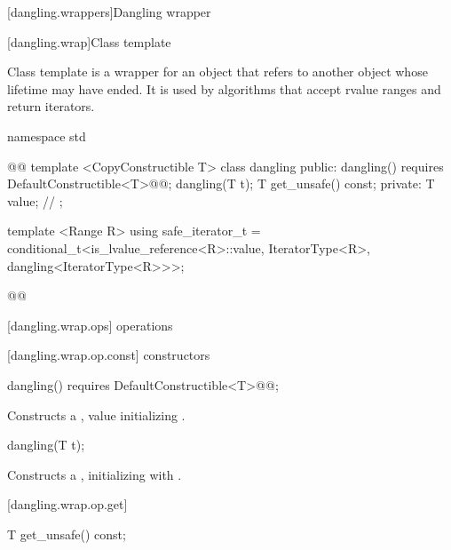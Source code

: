 \begin{addedblock}
{\color{newclr}
[dangling.wrappers]{Dangling wrapper}

[dangling.wrap]{Class template }

\pnum
{}%
Class template  is a wrapper for an object that refers to another object whose
lifetime may have ended. It is used by algorithms that accept rvalue ranges and return iterators.

\begin{codeblock}
namespace std { @@
  template <CopyConstructible T>
  class dangling {
  public:
    dangling() requires DefaultConstructible<T>@\newtxt{()}@;
    dangling(T t);
    T get_unsafe() const;
  private:
    T value; // \expos
  };

  template <Range R>
  using safe_iterator_t =
    conditional_t<is_lvalue_reference<R>::value, IteratorType<R>, dangling<IteratorType<R>>>;
}@\newtxt{\}\}}@
\end{codeblock}

[dangling.wrap.ops]{ operations}

[dangling.wrap.op.const]{ constructors}

%
\begin{itemdecl}
dangling() requires DefaultConstructible<T>@\newtxt{()}@;
\end{itemdecl}

\begin{itemdescr}
\pnum
\effects Constructs a , value initializing .
\end{itemdescr}

%
\begin{itemdecl}
dangling(T t);
\end{itemdecl}

\begin{itemdescr}
\pnum
\effects Constructs a , initializing  with .
\end{itemdescr}

[dangling.wrap.op.get]{}

%
%
\begin{itemdecl}
T get_unsafe() const;
\end{itemdecl}

}
\end{addedblock}
